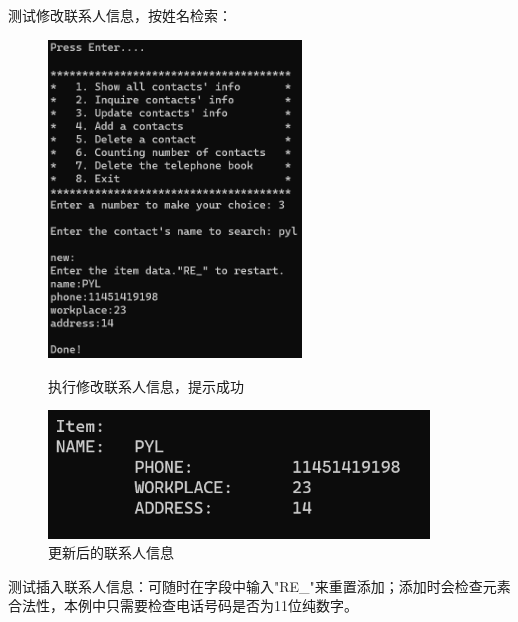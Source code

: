 \documentclass[12pt, a4paper, oneside]{ctexart}
\begin{document}
测试修改联系人信息，按姓名检索：

\begin{figure}[!h]
\begin{minipage}{0.49\linewidth}
        \centering
        \includegraphics[width=0.6\textwidth]{graphic/04.png}
        \caption{执行修改联系人信息，提示成功}
        \label{}
\end{minipage}
%
\begin{minipage}{0.49\linewidth}
        \centering
        \includegraphics[width=0.9\textwidth]{graphic/05.png}
        \caption{更新后的联系人信息}
        \label{}
\end{minipage}
\end{figure}

测试插入联系人信息：可随时在字段中输入"RE\_{}"来重置添加；添加时会检查元素合法性，本例中只需要检查电话号码是否为11位纯数字。
\end{document}
